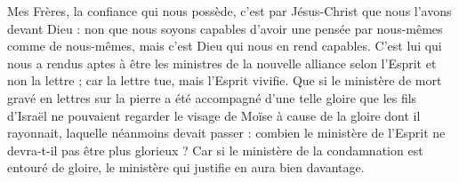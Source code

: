 Mes Frères, la confiance qui nous possède, c’est par Jésus-Christ que nous l’avons devant Dieu : non que nous soyons capables d’avoir une pensée par nous-mêmes comme de nous-mêmes, mais c’est Dieu qui nous en rend capables. C’est lui qui nous a rendus aptes à être les ministres de la nouvelle alliance selon l’Esprit et non la lettre ; car la lettre tue, mais l’Esprit vivifie. Que si le ministère de mort gravé en lettres sur la pierre a été accompagné d’une telle gloire que les fils d’Israël ne pouvaient regarder le visage de Moïse à cause de la gloire dont il rayonnait, laquelle néanmoins devait passer : combien le ministère de l’Esprit ne devra-t-il pas être plus glorieux ? Car si le ministère de la condamnation est entouré de gloire, le ministère qui justifie en aura bien davantage.
